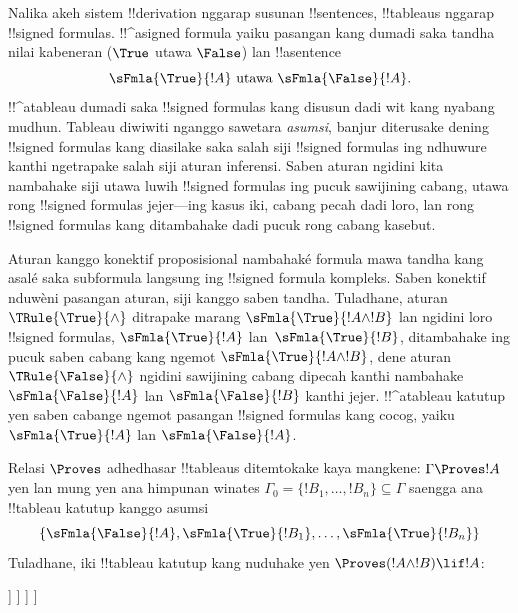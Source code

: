 \documentclass[../../../include/open-logic-section]{subfiles}
\begin{document}
      {}
      {}


Nalika akeh sistem !!{derivation} nggarap susunan !!{sentence}s,
!!{tableau}s nggarap !!{signed formula}s. !!^a{signed formula} yaiku
pasangan kang dumadi saka tandha nilai kabeneran ($\True$ utawa
$\False$) lan !!a{sentence}
\[
\sFmla{\True}{!A} \text{ utawa } \sFmla{\False}{!A}.
\]
!!^a{tableau} dumadi saka !!{signed formula}s kang disusun dadi wit
kang nyabang mudhun. Tableau diwiwiti nganggo sawetara
\emph{asumsi}, banjur diterusake dening !!{signed formula}s kang
diasilake saka salah siji !!{signed formula}s ing ndhuwure kanthi
ngetrapake salah siji aturan inferensi. Saben aturan ngidini kita
nambahake siji utawa luwih !!{signed formula}s ing pucuk sawijining
cabang, utawa rong !!{signed formula}s jejer---ing kasus iki, cabang
pecah dadi loro, lan rong !!{signed
  formula}s kang ditambahake dadi pucuk rong cabang kasebut.

Aturan kanggo konektif proposisional nambahaké formula mawa tandha kang asalé saka
subformula langsung ing !!{signed formula} kompleks.
Saben konektif nduwèni pasangan aturan, siji kanggo saben tandha.
Tuladhane, aturan $\TRule{\True}{\land}$ ditrapake marang
$\sFmla{\True}{!A \land !B}$ lan ngidini loro !!{signed formula}s,
$\sFmla{\True}{!A}$ lan~$\sFmla{\True}{!B}$, ditambahake ing pucuk
saben cabang kang ngemot $\sFmla{\True}{!A \land !B}$, dene aturan
$\TRule{\False}{\land}$ ngidini sawijining cabang dipecah kanthi
nambahake $\sFmla{\False}{!A}$ lan $\sFmla{\False}{!B}$ kanthi jejer.
!!^a{tableau} katutup yen saben cabange ngemot pasangan
!!{signed formula}s kang cocog, yaiku $\sFmla{\True}{!A}$ lan
$\sFmla{\False}{!A}$.

Relasi $\Proves$ adhedhasar !!{tableau}s ditemtokake kaya mangkene:
$\Gamma \Proves !A$ yen lan mung yen ana himpunan winates
$\Gamma_0 = \{!B_1, \dots, !B_n\} \subseteq \Gamma$ saengga ana
!!{tableau} katutup kanggo asumsi
\[
\{\sFmla{\False}{!A}, \sFmla{\True}{!B_1}, \dots, \sFmla{\True}{!B_n}\} 
\]
Tuladhane, iki !!{tableau} katutup kang nuduhake yen $\Proves
(!A \land !B) \lif !A$:
\begin{oltableau}
  [\sFmla{\False}{(\formula{A} \land \formula{B}) \lif \formula{A}}, just = \TAss
    [\sFmla{\True}{\formula{A} \land \formula{B}}, just = {\TRule{\False}{\lif}[1]}
      [\sFmla{\False}{\formula{A}}, just = {\TRule{\False}{\lif}[1]}
        [\sFmla{\True}{\formula{A}}, just = {\TRule{\True}{\land}[2]}
          [\sFmla{\True}{\formula{B}}, just = {\TRule{\True}{\land}[2]}, close]
        ]
      ]
    ]
  ]
\end{oltableau}
\end{document}
